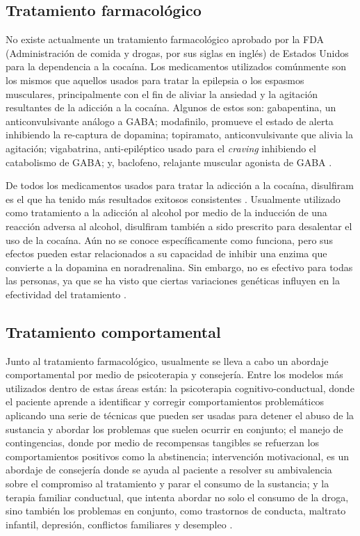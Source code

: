 \subsection{Tratamiento farmacológico}
No existe actualmente un tratamiento farmacológico aprobado por la FDA (Administración de comida y drogas, por sus siglas en inglés) de Estados Unidos para la dependencia a la cocaína.
Los medicamentos utilizados comúnmente son los mismos que aquellos usados para tratar la epilepsia o los espasmos musculares, principalmente con el fin de aliviar la ansiedad y la agitación resultantes de la adicción a la cocaína.
Algunos de estos son: gabapentina, un anticonvulsivante análogo a GABA; modafinilo, promueve el estado de alerta inhibiendo la re-captura de dopamina; topiramato, anticonvulsivante que alivia la agitación; vigabatrina, anti-epiléptico usado para el \textit{craving} inhibiendo el catabolismo de GABA; y, baclofeno, relajante muscular agonista de GABA \parencite{Volkow2007b}.\par
De todos los medicamentos usados para tratar la adicción a la cocaína, disulfiram es el que ha tenido más resultados exitosos consistentes \parencite{Volkow2007b}.
Usualmente utilizado como tratamiento a la adicción al alcohol por medio de la inducción de una reacción adversa al alcohol, disulfiram también a sido prescrito para desalentar el uso de la cocaína.
Aún no se conoce específicamente como funciona, pero sus efectos pueden estar relacionados a su capacidad de inhibir una enzima que convierte a la dopamina en noradrenalina.
Sin embargo, no es efectivo para todas las personas, ya que se ha visto que ciertas variaciones genéticas influyen en la efectividad del tratamiento \parencite{Gaval-Cruz2009a, Volkow2007b}.

\subsection{Tratamiento comportamental}
Junto al tratamiento farmacológico, usualmente se lleva a cabo un abordaje comportamental por medio de psicoterapia y consejería.
Entre los modelos más utilizados dentro de estas áreas están:
la psicoterapia cognitivo-conductual, donde el paciente aprende a identificar y corregir comportamientos problemáticos aplicando una serie de técnicas que pueden ser usadas para detener el abuso de la sustancia y abordar los problemas que suelen ocurrir en conjunto;
el manejo de contingencias, donde por medio de recompensas tangibles se refuerzan los comportamientos positivos como la abstinencia;
intervención motivacional, es un abordaje de consejería donde se ayuda al paciente a resolver su ambivalencia sobre el compromiso al tratamiento y parar el consumo de la sustancia;
y la terapia familiar conductual, que intenta abordar no solo el consumo de la droga, sino también los problemas en conjunto, como trastornos de conducta, maltrato infantil, depresión, conflictos familiares y desempleo \parencite{Volkow2008}.

